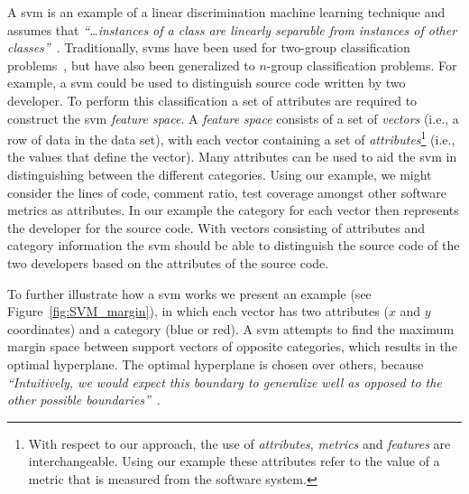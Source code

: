 
A \gls{svm} is an example of a linear discrimination machine learning technique and assumes that \emph{``\ldots instances of a class are linearly separable from instances of other classes''}~\cite{ALP04}. Traditionally, \gls{svm}s have been used for two-group classification problems~\cite{CV95}, but have also been generalized to $n$-group classification problems. For example, a \gls{svm} could be used to distinguish source code written by two developer. To perform this classification a set of attributes are required to construct the \gls{svm} \emph{feature space}. A \emph{feature space} consists of a set of \emph{vectors} (i.e., a row of data in the data set), with each vector containing a set of \emph{attributes}\footnote{With respect to our approach, the use of \emph{attributes}, \emph{metrics} and \emph{features} are interchangeable. Using our example these attributes refer to the value of a metric that is measured from the software system.} (i.e., the values that define the vector). Many attributes can be used to aid the \gls{svm} in distinguishing between the different categories. Using our example, we might consider the lines of code, comment ratio, test coverage amongst other software metrics as attributes. In our example the category for each vector then represents the developer for the source code. With vectors consisting of attributes and category information the \gls{svm} should be able to distinguish the source code of the two developers based on the attributes of the source code.

To further illustrate how a \gls{svm} works we present an example (see Figure~\ref{fig:SVM_margin}), in which each vector has two attributes ($x$ and $y$ coordinates) and a category (blue or red). A \gls{svm} attempts to find the maximum margin space between support vectors of opposite categories, which results in the optimal hyperplane. The optimal hyperplane is chosen over others, because \emph{``Intuitively, we would expect this boundary to generalize well as opposed to the other possible boundaries''}~\cite{Gun98}.

